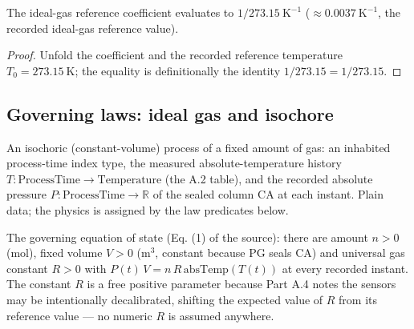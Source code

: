 \begin{lemma}
\label{lem:IPhO2026Problems_problem_IPhO_2026_4_A_5:idealThermalPressureCoefficient_value}
The ideal-gas reference coefficient evaluates to
$1/273.15\ \mathrm{K^{-1}}$ ($\approx 0.0037\ \mathrm{K^{-1}}$, the
recorded ideal-gas reference value).
\end{lemma}
\begin{proof}
Unfold the coefficient and the recorded reference temperature
$T_0 = 273.15\ \mathrm{K}$; the equality is definitionally the identity
$1/273.15 = 1/273.15$.
\end{proof}

\subsection*{Governing laws: ideal gas and isochore}

\begin{definition}
\label{def:IPhO2026Problems_problem_IPhO_2026_4_A_5:IsochoricProcess}
An isochoric (constant-volume) process of a fixed amount of gas: an
inhabited process-time index type, the measured absolute-temperature
history $T : \mathrm{ProcessTime} \to \mathrm{Temperature}$ (the A.2
table), and the recorded absolute pressure
$P : \mathrm{ProcessTime} \to \mathbb{R}$ of the sealed column CA at each
instant.  Plain data; the physics is assigned by the law predicates below.
\end{definition}

\begin{definition}
\label{def:IPhO2026Problems_problem_IPhO_2026_4_A_5:IsIdealGasLaw}
The governing equation of state (Eq. (1) of the source): there are amount
$n > 0$ (mol), fixed volume $V > 0$ ($\mathrm{m^3}$, constant because PG
seals CA) and universal gas constant $R > 0$ with
$P(t)\,V = n\,R\,\mathrm{absTemp}(T(t))$ at every recorded instant.  The
constant $R$ is a free positive parameter because Part A.4 notes the
sensors may be intentionally decalibrated, shifting the expected value of
$R$ from its reference value --- no numeric $R$ is assumed anywhere.
\end{definition}

